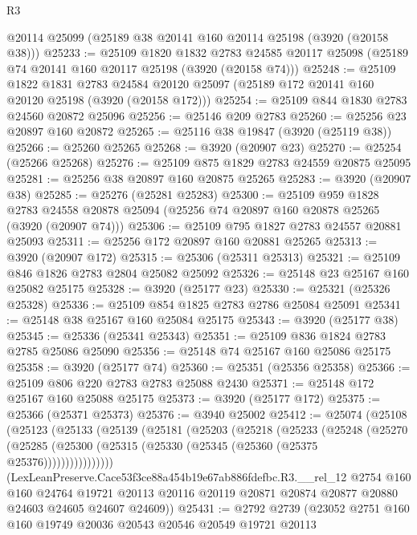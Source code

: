 \begin{lexlean}{R3}
\begin{coremodule}
    @20114
    @25099
    (@25189 @38 @20141 @160 @20114 @25198 (@3920 (@20158 @38)))
@25233 := @25109
    @1820
    @1832
    @2783
    @24585
    @20117
    @25098
    (@25189 @74 @20141 @160 @20117 @25198 (@3920 (@20158 @74)))
@25248 := @25109
    @1822
    @1831
    @2783
    @24584
    @20120
    @25097
    (@25189 @172 @20141 @160 @20120 @25198 (@3920 (@20158 @172)))
@25254 := @25109 @844 @1830 @2783 @24560 @20872 @25096
@25256 := @25146 @209 @2783
@25260 := @25256 @23 @20897 @160 @20872
@25265 := @25116 @38 @19847 (@3920 (@25119 @38))
@25266 := @25260 @25265
@25268 := @3920 (@20907 @23)
@25270 := @25254 (@25266 @25268)
@25276 := @25109 @875 @1829 @2783 @24559 @20875 @25095
@25281 := @25256 @38 @20897 @160 @20875 @25265
@25283 := @3920 (@20907 @38)
@25285 := @25276 (@25281 @25283)
@25300 := @25109
    @959
    @1828
    @2783
    @24558
    @20878
    @25094
    (@25256 @74 @20897 @160 @20878 @25265 (@3920 (@20907 @74)))
@25306 := @25109 @795 @1827 @2783 @24557 @20881 @25093
@25311 := @25256 @172 @20897 @160 @20881 @25265
@25313 := @3920 (@20907 @172)
@25315 := @25306 (@25311 @25313)
@25321 := @25109 @846 @1826 @2783 @2804 @25082 @25092
@25326 := @25148 @23 @25167 @160 @25082 @25175
@25328 := @3920 (@25177 @23)
@25330 := @25321 (@25326 @25328)
@25336 := @25109 @854 @1825 @2783 @2786 @25084 @25091
@25341 := @25148 @38 @25167 @160 @25084 @25175
@25343 := @3920 (@25177 @38)
@25345 := @25336 (@25341 @25343)
@25351 := @25109 @836 @1824 @2783 @2785 @25086 @25090
@25356 := @25148 @74 @25167 @160 @25086 @25175
@25358 := @3920 (@25177 @74)
@25360 := @25351 (@25356 @25358)
@25366 := @25109 @806 @220 @2783 @2783 @25088 @2430
@25371 := @25148 @172 @25167 @160 @25088 @25175
@25373 := @3920 (@25177 @172)
@25375 := @25366 (@25371 @25373)
@25376 := @3940 @25002
@25412 := @25074
    (@25108
      (@25123
        (@25133
          (@25139
            (@25181
              (@25203
                (@25218
                  (@25233
                    (@25248
                      (@25270
                        (@25285
                          (@25300 (@25315 (@25330 (@25345 (@25360 (@25375 @25376))))))))))))))))
      (LexLeanPreserve.Cace53f3ce88a454b19e67ab886fdefbc.R3.__rel_12
        @2754
        @160
        @160
        @24764
        @19721
        @20113
        @20116
        @20119
        @20871
        @20874
        @20877
        @20880
        @24603
        @24605
        @24607
        @24609))
@25431 := @2792
    @2739
    (@23052
      @2751
      @160
      @160
      @19749
      @20036
      @20543
      @20546
      @20549
      @19721
      @20113

\end{coremodule}
\end{lexlean}
